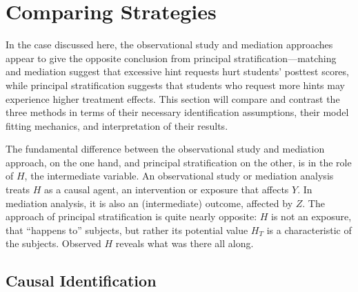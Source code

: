 \documentclass{article}\usepackage[]{graphicx}\usepackage[]{color}
\begin{document}
\section{Comparing Strategies}\label{sec:synthesis}
In the case discussed here, the observational study and mediation
approaches appear to give the opposite conclusion from principal
stratification---matching and mediation suggest that excessive hint
requests hurt students' posttest scores, while principal
stratification suggests that students who request more hints may
experience higher treatment effects.
This section will compare and contrast the three methods in terms of
 their necessary identification assumptions, their model fitting
 mechanics, and interpretation of their results.

The fundamental difference between the observational study and
mediation approach, on the one hand, and principal stratification on
the other, is in the role of $H$, the intermediate variable.
An observational study or mediation analysis treats $H$ as a causal
agent, an intervention or exposure that affects $Y$.
In mediation analysis, it is also an (intermediate) outcome, affected
by $Z$.
The approach of principal stratification is quite nearly opposite:
$H$ is not an exposure, that ``happens to'' subjects, but rather its
potential value $H_T$ is a characteristic of the subjects.
Observed $H$ reveals what was there all along.

\subsection{Causal Identification}
\end{document}
